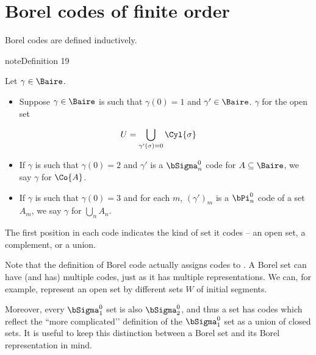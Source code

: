 \documentclass[letterpaper,10pt,english]{jupyterBook}
\begin{document}
\section{Borel codes of finite order}
\label{\detokenize{codingBorel:borel-codes-of-finite-order}}
\sphinxAtStartPar
Borel codes are defined inductively.
\label{codingBorel:def-Borel-codes}
\begin{sphinxadmonition}{note}{Definition 19}



\sphinxAtStartPar
Let \(\gamma \in \Baire\).
\begin{itemize}
\item {} 
\sphinxAtStartPar
Suppose \(\gamma \in \Baire\) is such that \(\gamma(0) = 1\) and \(\gamma' \in \Baire\). \(\gamma\)  for the open set

\end{itemize}
\begin{equation*}
    U = \bigcup_{\gamma'(\sigma) = 0} \Cyl{\sigma}
\end{equation*}\begin{itemize}
\item {} 
\sphinxAtStartPar
If \(\gamma\) is such that \(\gamma(0)=2\) and \(\gamma'\) is a \(\bSigma^0_n\) code for \(A \subseteq \Baire\), we say \(\gamma\)  for \(\Co{A}\).

\item {} 
\sphinxAtStartPar
If \(\gamma\) is such that \(\gamma(0)=3\) and for each \(m\), \((\gamma')_m\) is a \(\bPi^0_n\) code of a set \(A_m\), we say \(\gamma\)  for \(\bigcup_n A_n\).

\end{itemize}
\end{sphinxadmonition}

\sphinxAtStartPar
The first position in each code indicates the kind of set it codes – an open set, a complement, or a union.

\sphinxAtStartPar
Note that the definition of Borel code actually assigns codes to . A Borel set can have (and has) multiple codes, just as it has multiple representations. We can, for example, represent an open set by different sets \(W\) of initial segments.

\sphinxAtStartPar
Moreover, every \(\bSigma^0_1\) set is also \(\bSigma^0_2\), and thus a set has codes which reflect the ``more complicated’’ definition of the \(\bSigma^0_1\) set as a union of closed sets. It is useful to keep this distinction between a Borel set and its Borel representation in mind.
\end{document}
